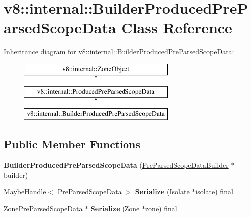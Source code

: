 \hypertarget{classv8_1_1internal_1_1BuilderProducedPreParsedScopeData}{}\section{v8\+:\+:internal\+:\+:Builder\+Produced\+Pre\+Parsed\+Scope\+Data Class Reference}
\label{classv8_1_1internal_1_1BuilderProducedPreParsedScopeData}
Inheritance diagram for v8\+:\+:internal\+:\+:Builder\+Produced\+Pre\+Parsed\+Scope\+Data\+:\begin{figure}[H]
\begin{center}
\leavevmode
\includegraphics[height=3.000000cm]{classv8_1_1internal_1_1BuilderProducedPreParsedScopeData}
\end{center}
\end{figure}
\subsection*{Public Member Functions}
\begin{DoxyCompactItemize}
\item 
\mbox{\label{classv8_1_1internal_1_1BuilderProducedPreParsedScopeData_aecf6bfad8e71d237b0a7655f1415f58a}} 
{\bfseries Builder\+Produced\+Pre\+Parsed\+Scope\+Data} (\mbox{\hyperlink{classv8_1_1internal_1_1PreParsedScopeDataBuilder}{Pre\+Parsed\+Scope\+Data\+Builder}} $\ast$builder)
\item 
\mbox{\label{classv8_1_1internal_1_1BuilderProducedPreParsedScopeData_aa66cf3dfebccb1696f2f031a5c2a26ba}} 
\mbox{\hyperlink{classv8_1_1internal_1_1MaybeHandle}{Maybe\+Handle}}$<$ \mbox{\hyperlink{classv8_1_1internal_1_1PreParsedScopeData}{Pre\+Parsed\+Scope\+Data}} $>$ {\bfseries Serialize} (\mbox{\hyperlink{classv8_1_1internal_1_1Isolate}{Isolate}} $\ast$isolate) final
\item 
\mbox{\label{classv8_1_1internal_1_1BuilderProducedPreParsedScopeData_aadaef94df364a37bee159cebe60c315e}} 
\mbox{\hyperlink{classv8_1_1internal_1_1ZonePreParsedScopeData}{Zone\+Pre\+Parsed\+Scope\+Data}} $\ast$ {\bfseries Serialize} (\mbox{\hyperlink{classv8_1_1internal_1_1Zone}{Zone}} $\ast$zone) final
\end{DoxyCompactItemize}
